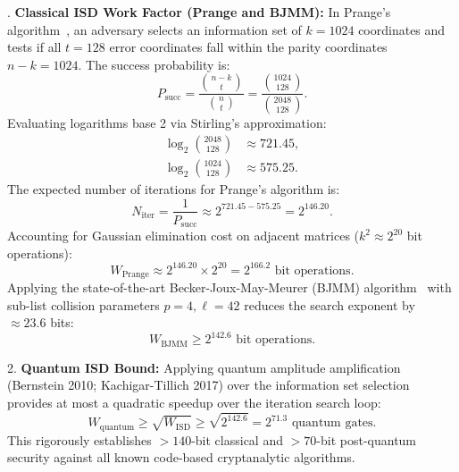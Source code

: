 \documentclass{ieeeaccess}
\newenvironment{proof}{\begin{IEEEproof}\IEEEQEDoff}{\end{IEEEproof}}
\begin{document}
\begin{proof}
1. \textbf{Classical ISD Work Factor (Prange and BJMM):}
In Prange's algorithm~\cite{Peters2010}, an adversary selects an information set of $k=1024$ coordinates and tests if all $t=128$ error coordinates fall within the parity coordinates $n-k=1024$. The success probability is:
\begin{equation}
  P_{\mathrm{succ}} = \frac{\binom{n - k}{t}}{\binom{n}{t}} = \frac{\binom{1024}{128}}{\binom{2048}{128}}.
\end{equation}
Evaluating logarithms base 2 via Stirling's approximation:
\begin{equation}
\begin{aligned}
  \log_2 \binom{2048}{128} &\approx 721.45, \\
  \log_2 \binom{1024}{128} &\approx 575.25.
\end{aligned}
\end{equation}
The expected number of iterations for Prange's algorithm is:
\begin{equation}
  N_{\mathrm{iter}} = \frac{1}{P_{\mathrm{succ}}} \approx 2^{721.45 - 575.25} = 2^{146.20}.
\end{equation}
Accounting for Gaussian elimination cost on adjacent matrices ($k^2 \approx 2^{20}$ bit operations):
\begin{equation}
  W_{\mathrm{Prange}} \approx 2^{146.20} \times 2^{20} = 2^{166.2} \text{ bit operations}.
\end{equation}
Applying the state-of-the-art Becker-Joux-May-Meurer (BJMM) algorithm~\cite{BJMM2012} with sub-list collision parameters $p=4, \ell=42$ reduces the search exponent by $\approx 23.6$ bits:
\begin{equation}
  W_{\mathrm{BJMM}} \ge 2^{142.6} \text{ bit operations}.
\end{equation}

2. \textbf{Quantum ISD Bound:}
Applying quantum amplitude amplification (Bernstein 2010; Kachigar-Tillich 2017) over the information set selection provides at most a quadratic speedup over the iteration search loop:
\begin{equation}
  W_{\mathrm{quantum}} \ge \sqrt{W_{\mathrm{ISD}}} \ge \sqrt{2^{142.6}} = 2^{71.3} \text{ quantum gates}.
\end{equation}
This rigorously establishes $>140$-bit classical and $>70$-bit post-quantum security against all known code-based cryptanalytic algorithms.
\end{proof}
\end{document}
